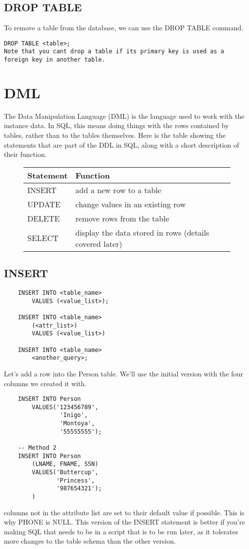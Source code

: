 \documentclass{report}
\begin{document}
\subsection{DROP TABLE}
To remove a table from the database, we can use the DROP TABLE command.
\begin{verbatim}
DROP TABLE <table>;
Note that you cant drop a table if its primary key is used as a foreign key in another table.
\end{verbatim}
\section{DML}
The Data Manipulation Language (DML) is the language used to work with the instance data. In SQL, this means doing things with the rows contained by tables, rather than to the tables themselves.
\bigbreak \noindent
Here is the table showing the statements that are part of the DDL in SQL, along with a short description of their function.
    \begin{figure}[ht]
    \centering
    \begin{tabular}{l l}
        \toprule
        Statement & Function  \\
        \midrule
        INSERT & add a new row to a table \\
        UPDATE & change values in an existing row \\
        DELETE & remove rows from the table \\
        SELECT & display the data stored in rows (details covered later) \\
        \bottomrule
    \end{tabular}
    \end{figure}
    \subsection{INSERT}
    \begin{verbatim}
    INSERT INTO <table_name>
        VALUES (<value_list>);

    INSERT INTO <table_name>
        (<attr_list>)
        VALUES (<value_list>)

    INSERT INTO <table_name>
        <another_query>;
    \end{verbatim}     
    Let's add a row into the Person table. We'll use the initial version with the four columns we created it with.
    \begin{verbatim}
    INSERT INTO Person
        VALUES('123456789',
                'Inigo',
                'Montoya',
                '55555555');

    -- Method 2
    INSERT INTO Person
        (LNAME, FNAME, SSN)
        VALUES('Buttercup',
               'Princess',
               '987654321');
        )
    \end{verbatim}
    columns not in the attribute list are set to their default value if possible. This is why PHONE is NULL. This version of the INSERT statement is better if you're making SQL that needs to be in a script that is to be run later, as it tolerates more changes to the table schema than the other version. 
\end{document}
